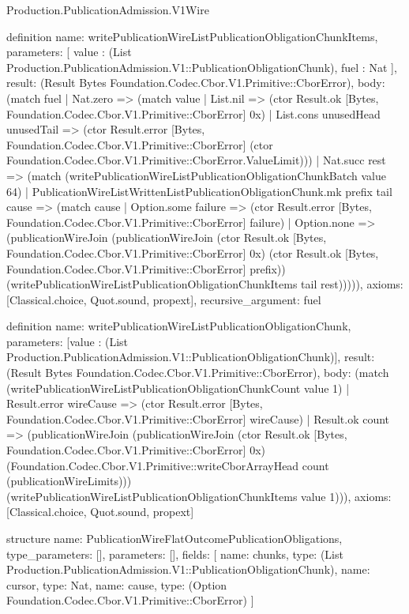 \begin{lexlean}{Production.PublicationAdmission.V1Wire}
\begin{semanticmodule}
definition{
  name: writePublicationWireListPublicationObligationChunkItems,
  parameters: [
    value : (List Production.PublicationAdmission.V1::PublicationObligationChunk),
    fuel : Nat
  ],
  result: (Result Bytes Foundation.Codec.Cbor.V1.Primitive::CborError),
  body: (match fuel
    | Nat.zero => (match value
      | List.nil => (ctor Result.ok [Bytes, Foundation.Codec.Cbor.V1.Primitive::CborError] 0x)
      | List.cons unusedHead unusedTail => (ctor Result.error [Bytes, Foundation.Codec.Cbor.V1.Primitive::CborError] (ctor Foundation.Codec.Cbor.V1.Primitive::CborError.ValueLimit)))
    | Nat.succ rest => (match (writePublicationWireListPublicationObligationChunkBatch value 64)
      | PublicationWireListWrittenListPublicationObligationChunk.mk prefix tail cause => (match cause
        | Option.some failure => (ctor Result.error [Bytes, Foundation.Codec.Cbor.V1.Primitive::CborError] failure)
        | Option.none => (publicationWireJoin (publicationWireJoin (ctor Result.ok [Bytes, Foundation.Codec.Cbor.V1.Primitive::CborError] 0x) (ctor Result.ok [Bytes, Foundation.Codec.Cbor.V1.Primitive::CborError] prefix)) (writePublicationWireListPublicationObligationChunkItems tail rest))))),
  axioms: [Classical.choice, Quot.sound, propext],
  recursive_argument: fuel
}

definition{
  name: writePublicationWireListPublicationObligationChunk,
  parameters: [value : (List Production.PublicationAdmission.V1::PublicationObligationChunk)],
  result: (Result Bytes Foundation.Codec.Cbor.V1.Primitive::CborError),
  body: (match (writePublicationWireListPublicationObligationChunkCount value 1)
    | Result.error wireCause => (ctor Result.error [Bytes, Foundation.Codec.Cbor.V1.Primitive::CborError] wireCause)
    | Result.ok count => (publicationWireJoin (publicationWireJoin (ctor Result.ok [Bytes, Foundation.Codec.Cbor.V1.Primitive::CborError] 0x) (Foundation.Codec.Cbor.V1.Primitive::writeCborArrayHead count (publicationWireLimits))) (writePublicationWireListPublicationObligationChunkItems value 1))),
  axioms: [Classical.choice, Quot.sound, propext]
}

structure{
  name: PublicationWireFlatOutcomePublicationObligations,
  type_parameters: [],
  parameters: [],
  fields: [
    {name: chunks, type: (List Production.PublicationAdmission.V1::PublicationObligationChunk)},
    {name: cursor, type: Nat},
    {name: cause, type: (Option Foundation.Codec.Cbor.V1.Primitive::CborError)}
  ]
}


\end{semanticmodule}
\end{lexlean}
